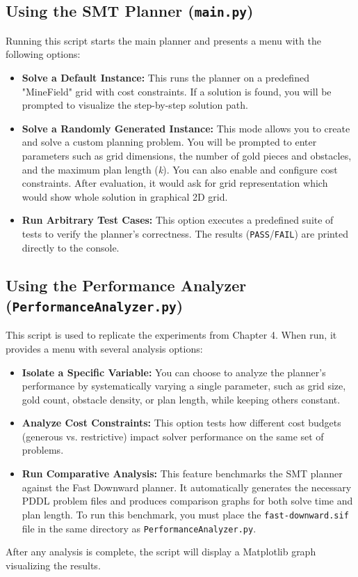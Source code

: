 \documentclass[12pt, a4paper, oneside]{report} %
\begin{document}
\subsection{Using the SMT Planner (\texttt{main.py})}
Running this script starts the main planner and presents a menu with the following options:
\begin{itemize}
    \item \textbf{Solve a Default Instance:} This runs the planner on a predefined "MineField" grid with cost constraints. If a solution is found, you will be prompted to visualize the step-by-step solution path.
    \item \textbf{Solve a Randomly Generated Instance:} This mode allows you to create and solve a custom planning problem. You will be prompted to enter parameters such as grid dimensions, the number of gold pieces and obstacles, and the maximum plan length (\textit{k}). You can also enable and configure cost constraints. After evaluation, it would ask for grid representation which would show whole solution in graphical 2D grid.
    \item \textbf{Run Arbitrary Test Cases:} This option executes a predefined suite of tests to verify the planner's correctness. The results (\texttt{PASS}/\texttt{FAIL}) are printed directly to the console.
\end{itemize}

\subsection{Using the Performance Analyzer (\texttt{PerformanceAnalyzer.py})}
This script is used to replicate the experiments from Chapter 4. When run, it provides a menu with several analysis options:
\begin{itemize}
    \item \textbf{Isolate a Specific Variable:} You can choose to analyze the planner's performance by systematically varying a single parameter, such as grid size, gold count, obstacle density, or plan length, while keeping others constant.
    \item \textbf{Analyze Cost Constraints:} This option tests how different cost budgets (generous vs. restrictive) impact solver performance on the same set of problems.
    \item \textbf{Run Comparative Analysis:} This feature benchmarks the SMT planner against the Fast Downward planner. It automatically generates the necessary PDDL problem files and produces comparison graphs for both solve time and plan length. To run this benchmark, you must place the \texttt{fast-downward.sif} file in the same directory as \texttt{PerformanceAnalyzer.py}.
\end{itemize}
After any analysis is complete, the script will display a Matplotlib graph visualizing the results.
\clearpage
\end{document}
